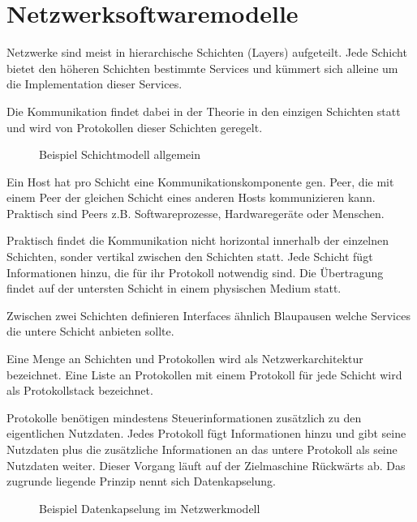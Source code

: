 \section{Netzwerksoftwaremodelle}

Netzwerke sind meist in hierarchische Schichten (Layers) aufgeteilt. Jede Schicht bietet den höheren Schichten bestimmte Services und kümmert sich alleine um die Implementation dieser Services.

Die Kommunikation findet dabei in der Theorie in den einzigen Schichten statt und wird von Protokollen dieser Schichten geregelt.

\begin{figure}[H]
    \centering
    
    \caption{Beispiel Schichtmodell allgemein}
    \label{fig:schichtmodell}
\end{figure}
\FloatBarrier

Ein Host hat pro Schicht eine Kommunikationskomponente gen. Peer, die mit einem Peer der gleichen Schicht eines anderen Hosts kommunizieren kann. Praktisch sind Peers z.B. Softwareprozesse, Hardwaregeräte oder Menschen.

Praktisch findet die Kommunikation nicht horizontal innerhalb der einzelnen Schichten, sonder vertikal zwischen den Schichten statt. Jede Schicht fügt Informationen hinzu, die für ihr Protokoll notwendig sind. Die Übertragung findet auf der untersten Schicht in einem physischen Medium statt.

Zwischen zwei Schichten definieren Interfaces ähnlich Blaupausen welche Services die untere Schicht anbieten sollte.

Eine Menge an Schichten und Protokollen wird als Netzwerkarchitektur bezeichnet. Eine Liste an Protokollen mit einem Protokoll für jede Schicht wird als Protokollstack bezeichnet.

Protokolle benötigen mindestens Steuerinformationen zusätzlich zu den eigentlichen Nutzdaten. Jedes Protokoll fügt Informationen hinzu und gibt seine Nutzdaten plus die zusätzliche Informationen an das untere Protokoll als seine Nutzdaten weiter. Dieser Vorgang läuft auf der Zielmaschine Rückwärts ab. Das zugrunde liegende Prinzip nennt sich Datenkapselung.

\begin{figure}[H]
    \centering
    
    \caption{Beispiel Datenkapselung im Netzwerkmodell}
    \label{fig:Datenkapselung}
\end{figure}
\FloatBarrier

